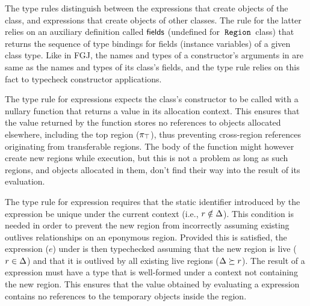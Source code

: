 
The type rules distinguish between the  expressions that create
objects of  the \RgnZ class, and  expressions that create
objects of other classes. The rule for the latter relies on an
auxiliary definition called ${\sf fields}$ (undefined for $\,{\tt Region}\,$ class)
that returns the sequence of type bindings for fields (instance
variables) of a given class type.  Like in FGJ, the names and types of
a constructor's arguments in \FB are same as the names and types of
its class's fields, and the type rule relies on this fact to typecheck
constructor applications.  

The type rule for  expressions expects the \RgnZ class's
constructor to be called with a nullary function that returns a value
in its allocation context. 
This ensures that the value returned by the function stores no
references to objects allocated elsewhere, including the top region
($\pi_{\top}$), thus preventing cross-region references originating from
transferable regions. The body of the function might however create
new regions while execution, but this is not a problem as long as such
regions, and objects allocated in them, don't find their way into the
result of its evaluation.

The type rule for  expression requires that the static
identifier introduced by the expression be unique under the current
context (i.e., $r \notin \Delta$). This condition is needed in
order to prevent the new region from incorrectly assuming existing
outlives relationships on an eponymous region. Provided this is
satisfied, the expression ($e$) under  is then
typechecked assuming that the new region is live ($r \in \Delta$)
and that it is outlived by all existing live regions ($\Delta
\succeq r$). The result of a  expression must have a
type that is well-formed under a context not containing the new
region. This ensures that the value obtained by evaluating a
 expression contains no references to the temporary
objects inside the region.

